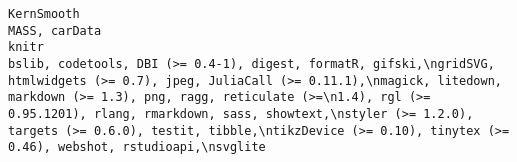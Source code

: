 \documentclass[
  letterpaper,
  DIV=11,
  numbers=noendperiod]{scrreprt}
\begin{document}
\begin{verbatim}
KernSmooth                                                                                                                                                                                                                                                                                                                                                                                                                                                                                                                                                                                                                                                                                                                                                                                                                                                                                                                                                                                                                                                                                                                                                                                                                                                                                      MASS, carData
knitr                                                                                                                                                                                                                                                                                                                                                                                                                                                                                                                                                                                                                                                                                                                                                                                                                                                                                                                    bslib, codetools, DBI (>= 0.4-1), digest, formatR, gifski,\ngridSVG, htmlwidgets (>= 0.7), jpeg, JuliaCall (>= 0.11.1),\nmagick, litedown, markdown (>= 1.3), png, ragg, reticulate (>=\n1.4), rgl (>= 0.95.1201), rlang, rmarkdown, sass, showtext,\nstyler (>= 1.2.0), targets (>= 0.6.0), testit, tibble,\ntikzDevice (>= 0.10), tinytex (>= 0.46), webshot, rstudioapi,\nsvglite

\end{verbatim}
\end{document}

